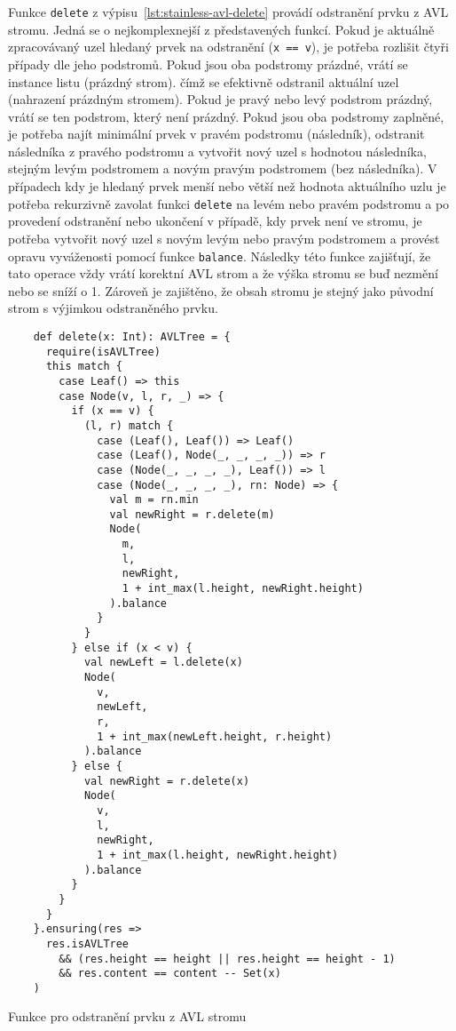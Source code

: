 Funkce \texttt{delete} z výpisu~\ref{lst:stainless-avl-delete}
provádí odstranění prvku z AVL stromu.
Jedná se o nejkomplexnejší z představených funkcí.
Pokud je aktuálně zpracovávaný uzel hledaný prvek na odstranění (\texttt{x == v}),
je potřeba rozlišit čtyři případy dle jeho podstromů.
Pokud jsou oba podstromy prázdné, vrátí se instance listu (prázdný strom).
čímž se efektivně odstranil aktuální uzel (nahrazení prázdným stromem).
Pokud je pravý nebo levý podstrom prázdný,
vrátí se ten podstrom, který není prázdný.
Pokud jsou oba podstromy zaplněné,
je potřeba najít minimální prvek v pravém podstromu (následník),
odstranit následníka z pravého podstromu
a vytvořit nový uzel s hodnotou následníka, stejným levým podstromem
a novým pravým podstromem (bez následníka).
V případech kdy je hledaný prvek menší nebo větší než hodnota aktuálního uzlu
je potřeba rekurzivně zavolat funkci \texttt{delete} na levém nebo pravém podstromu
a po provedení odstranění nebo ukončení v případě, kdy prvek není ve stromu,
je potřeba vytvořit nový uzel s novým levým nebo pravým podstromem
a provést opravu vyváženosti pomocí funkce \texttt{balance}.
Následky této funkce zajišťují, že tato operace vždy vrátí korektní AVL strom
a že výška stromu se buď nezmění nebo se sníží o 1.
Zároveň je zajištěno, že obsah stromu je stejný jako původní strom
s výjimkou odstraněného prvku.

\begin{listing}[H]
  \begin{verbatim}
    def delete(x: Int): AVLTree = {
      require(isAVLTree)
      this match {
        case Leaf() => this
        case Node(v, l, r, _) => {
          if (x == v) {
            (l, r) match {
              case (Leaf(), Leaf()) => Leaf()
              case (Leaf(), Node(_, _, _, _)) => r
              case (Node(_, _, _, _), Leaf()) => l
              case (Node(_, _, _, _), rn: Node) => {
                val m = rn.min
                val newRight = r.delete(m)
                Node(
                  m,
                  l,
                  newRight,
                  1 + int_max(l.height, newRight.height)
                ).balance
              }
            }
          } else if (x < v) {
            val newLeft = l.delete(x)
            Node(
              v,
              newLeft,
              r,
              1 + int_max(newLeft.height, r.height)
            ).balance
          } else {
            val newRight = r.delete(x)
            Node(
              v,
              l,
              newRight,
              1 + int_max(l.height, newRight.height)
            ).balance
          }
        }
      }
    }.ensuring(res =>
      res.isAVLTree
        && (res.height == height || res.height == height - 1)
        && res.content == content -- Set(x)
    )
  \end{verbatim}
  \caption{Funkce pro odstranění prvku z AVL stromu}
  \label{lst:stainless-avl-delete}
\end{listing}


